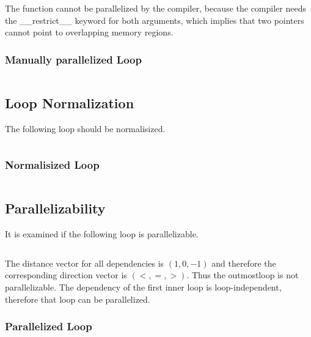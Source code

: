 \documentclass[parskip]{scrartcl}
\begin{document}
	The function cannot be parallelized by the compiler, because the compiler needs the \_\_restrict\_\_ keyword for both arguments, which implies that two pointers cannot point to overlapping memory regions.
	
	\subsubsection{Manually parallelized Loop}
	\inputminted	[linenos]{c}{ex2/01_par.c}
	
	\subsection{Loop Normalization}
	The following loop should be normalisized.
	
	\inputminted	[linenos]{c}{ex2/02.c}
	
	\subsubsection{Normalisized Loop}
	\inputminted	[linenos]{c}{ex2/02_normal.c}
	
	\subsection{Parallelizability}
	It is examined if the following loop is parallelizable.
	
	\inputminted	[linenos]{c}{ex2/03.c}
	
	The distance vector for all dependencies is $(1,0,-1)$ and therefore the corresponding direction vector is $(<,=,>)$. Thus the outmostloop is not parallelizable. The dependency of the first inner loop is loop-independent, therefore that loop can be parallelized.
	
	\subsubsection{Parallelized Loop}
	\inputminted[linenos]{c}{ex2/03_par.c}
\end{document}
